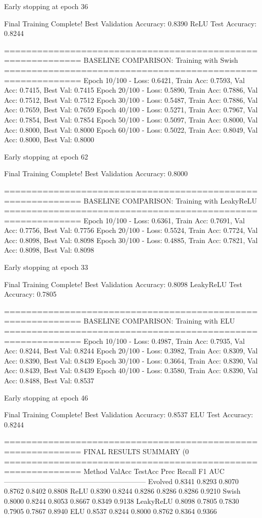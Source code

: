 Early stopping at epoch 36

Final Training Complete!
Best Validation Accuracy: 0.8390
ReLU Test Accuracy: 0.8244

============================================================
BASELINE COMPARISON: Training with Swish
============================================================
Epoch  10/100 - Loss: 0.6421, Train Acc: 0.7593, Val Acc: 0.7415, Best Val: 0.7415
Epoch  20/100 - Loss: 0.5890, Train Acc: 0.7886, Val Acc: 0.7512, Best Val: 0.7512
Epoch  30/100 - Loss: 0.5487, Train Acc: 0.7886, Val Acc: 0.7659, Best Val: 0.7659
Epoch  40/100 - Loss: 0.5271, Train Acc: 0.7967, Val Acc: 0.7854, Best Val: 0.7854
Epoch  50/100 - Loss: 0.5097, Train Acc: 0.8000, Val Acc: 0.8000, Best Val: 0.8000
Epoch  60/100 - Loss: 0.5022, Train Acc: 0.8049, Val Acc: 0.8000, Best Val: 0.8000

Early stopping at epoch 62

Final Training Complete!
Best Validation Accuracy: 0.8000

============================================================
BASELINE COMPARISON: Training with LeakyReLU
============================================================
Epoch  10/100 - Loss: 0.6361, Train Acc: 0.7691, Val Acc: 0.7756, Best Val: 0.7756
Epoch  20/100 - Loss: 0.5524, Train Acc: 0.7724, Val Acc: 0.8098, Best Val: 0.8098
Epoch  30/100 - Loss: 0.4885, Train Acc: 0.7821, Val Acc: 0.8098, Best Val: 0.8098

Early stopping at epoch 33

Final Training Complete!
Best Validation Accuracy: 0.8098
LeakyReLU Test Accuracy: 0.7805

============================================================
BASELINE COMPARISON: Training with ELU
============================================================
Epoch  10/100 - Loss: 0.4987, Train Acc: 0.7935, Val Acc: 0.8244, Best Val: 0.8244
Epoch  20/100 - Loss: 0.3982, Train Acc: 0.8309, Val Acc: 0.8390, Best Val: 0.8439
Epoch  30/100 - Loss: 0.3664, Train Acc: 0.8390, Val Acc: 0.8439, Best Val: 0.8439
Epoch  40/100 - Loss: 0.3580, Train Acc: 0.8390, Val Acc: 0.8488, Best Val: 0.8537

Early stopping at epoch 46

Final Training Complete!
Best Validation Accuracy: 0.8537
ELU Test Accuracy: 0.8244

============================================================
FINAL RESULTS SUMMARY (0%
============================================================
Method             ValAcc     TestAcc    Prec       Recall     F1         AUC
------------------------------------------------------------
Evolved            0.8341     0.8293     0.8070     0.8762     0.8402     0.8808
ReLU               0.8390     0.8244     0.8286     0.8286     0.8286     0.9210
Swish              0.8000     0.8244     0.8053     0.8667     0.8349     0.9138
LeakyReLU          0.8098     0.7805     0.7830     0.7905     0.7867     0.8940
ELU                0.8537     0.8244     0.8000     0.8762     0.8364     0.9366

